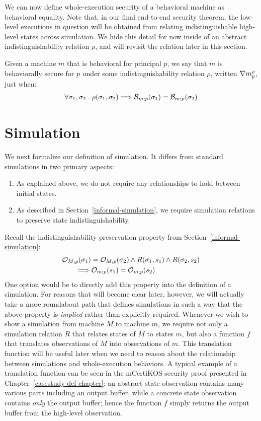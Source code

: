\noindent
We can now define whole-execution security of a behavioral machine as
behavioral equality. Note that, in our final end-to-end security theorem,
the low-level executions in question will be obtained from relating
indistinguishable high-level states across simulation. We hide this
detail for now inside of an abstract indistinguishability relation $\rho$, 
and will revisit the relation later in this section.

\begin{definition}
Given a machine $m$ that is behavioral for principal $p$, we say that $m$ 
is behaviorally secure for $p$ under some indistinguishability relation $\rho$, 
written $\nabla m^{\rho}_{p}$, just when:
\[\forall \sigma_1, \sigma_2 \hspace{1mm} . \hspace{1mm} 
\rho(\sigma_1, \sigma_2) \Longrightarrow 
\mathcal{B}_{m;p}(\sigma_1) = \mathcal{B}_{m;p}(\sigma_2)\]
\end{definition}

\section{Simulation}
We next formalize our definition of simulation. It differs
from standard simulations in two primary aspects:
\begin{enumerate}
\item As explained above, we do not require any relationships to 
hold between initial states.
\item As described in Section~\ref{informal-simulation}, we require
simulation relations to preserve state indistinguishability.
\end{enumerate}

\noindent
Recall the indistinguishability preservation property from 
Section~\ref{informal-simulation}:
{\small
\begin{align*}
& \mathcal{O}_{M;p}(\sigma_1) = \mathcal{O}_{M;p}(\sigma_2) \land
R(\sigma_1,s_1) \land R(\sigma_2,s_2) \\
& \qquad \Longrightarrow
\mathcal{O}_{m;p}(s_1) = \mathcal{O}_{m;p}(s_2)
\end{align*}}%
\noindent{}One option would be to directly add this property
into the definition of a simulation. For reasons that will
become clear later, however, we will actually take a more
roundabout path that defines simulations in such a way that
the above property is \emph{implied} rather than explicitly
required. Whenever we wish to show a simulation from machine $M$
to machine $m$, we require not only a simulation relation $R$
that relates states of $M$ to states $m$, but also a function $f$
that translates observations of $M$ into observations of $m$.
This translation function will be useful later when we need to 
reason about the relationship between simulations and whole-execution
behaviors. A typical example of a translation function can
be seen in the mCertiKOS security proof presented in 
Chapter~\ref{casestudy-def-chapter}: an abstract state observation contains
many various parts including an output buffer, while a concrete state 
observation contains \emph{only} the output buffer; 
hence the function $f$ simply returns the output buffer from the
high-level observation.

